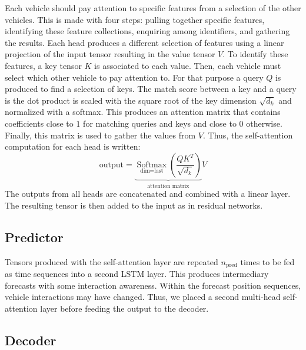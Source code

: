 \documentclass[a4paper, 10pt, conference]{ieeeconf}      %
\begin{document}
Each vehicle should pay attention to specific features from a selection of the other vehicles.
This is made with four steps: pulling together specific features, identifying these feature collections,
enquiring among identifiers, and gathering the results.
Each head produces a different selection of features using a linear projection of
the input tensor resulting in the value tensor $V$.
To identify these features, a key tensor $K$ is associated to each value.
Then, each vehicle must select which other vehicle to pay attention to.
For that purpose a query $Q$ is produced to find a selection of keys.
The match score between a key and a query is the dot product is scaled with the square root of the key
dimension $\sqrt{d_k}$ and normalized with a softmax.
This produces an attention matrix that contains coefficients close to $1$ for matching queries and keys
and close to $0$ otherwise.
Finally, this matrix is used to gather the values from $V$.
Thus, the self-attention computation for each head is written:
\begin{equation}
    \text{output}=\underbrace{\underset{\text{dim}=\text{last}}{\operatorname{Softmax}}\left(\frac{QK^T}{\sqrt{d_k}}\right)}_{\text{attention matrix}}V
    \label{eq_selfattention}
\end{equation}
The outputs from all heads are concatenated and combined with a linear layer.
The resulting tensor is then added to the input as in residual networks.

\subsection{Predictor}
Tensors produced with the self-attention layer are repeated $n_{\text{pred}}$ times to be fed as time sequences
into a second LSTM layer.
This produces intermediary forecasts with some interaction awareness.
Within the forecast position sequences, vehicle interactions may have changed.
Thus, we placed a second multi-head self-attention layer before feeding the output to the decoder.

\subsection{Decoder}
\end{document}
